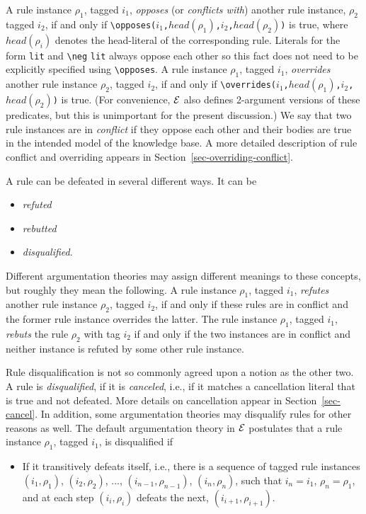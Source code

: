 \documentclass[11pt]{article}
\newcommand{\ERGO}{\mbox{\ensuremath{\cal{E}}\smaller{{\sc{RGO}}}}\xspace}
\newcommand{\FLSYSTEM}{\ERGO}
\newcommand{\bs}{\textbackslash}
\newcommand{\RULELOGNEG}{{\texttt{{\bs}neg}}\xspace}
\begin{document}
A rule instance $\rho_1$, tagged $i_1$, \emph{opposes}
(or \emph{conflicts with})  another rule
instance, $\rho_2$ tagged $i_2$, if and only if
\texttt{\bs{}opposes($i_1$,$head(\rho_1)$,$i_2$,$head(\rho_2)$)} is true,
where $head(\rho_i)$ denotes the head-literal of the corresponding rule.
Literals for the form \texttt{lit} and \texttt{\RULELOGNEG}  \texttt{lit} always oppose 
each other so this fact does not need to be explicitly specified using
\texttt{\bs{}opposes}.   
A rule instance $\rho_1$, tagged
$i_1$, \emph{overrides} another rule instance $\rho_2$, tagged $i_2$, if and
only if \texttt{\bs{}overrides($i_1$,$head(\rho_1)$,$i_2$,$head(\rho_2)$)} is
true. (For convenience, \FLSYSTEM also defines 2-argument versions of these
predicates, but this is unimportant for the present discussion.)
We say that two rule instances are in \emph{conflict} if they oppose each other
and their bodies are true in the intended model of the knowledge base.
A more detailed description of rule conflict and overriding appears in
Section~\ref{sec-overriding-conflict}.

A rule can be defeated in several different ways. It can be
\begin{itemize}
\item  \emph{refuted}
\item  \emph{rebutted} 
\item  \emph{disqualified}. 
\end{itemize}
Different argumentation theories may assign different meanings to these
concepts, but roughly they mean the following. A rule instance $\rho_1$,
tagged $i_1$, \emph{refutes} another rule instance $\rho_2$, tagged $i_2$, 
if and only if these rules are in conflict and the former rule instance
overrides the latter. The rule instance $\rho_1$,
tagged $i_1$, \emph{rebuts} the rule $\rho_2$ with tag $i_2$ if and only if the two
instances are in conflict and neither instance is refuted by some other
rule instance.

Rule disqualification is not so commonly agreed upon a notion as the other
two.  A rule is \emph{disqualified}, if it is \emph{canceled}, i.e., 
if it matches a
cancellation literal that is true and not defeated.  More details on
cancellation appear in Section~\ref{sec-cancel}. In addition, some
argumentation theories may disqualify rules for other reasons as well.
The default argumentation theory in \FLSYSTEM postulates that a
rule instance $\rho_1$, tagged $i_1$, is disqualified if
\begin{itemize}
\item If it transitively defeats itself, i.e., there is a sequence of
  tagged rule instances $(i_1,\rho_1)$, $(i_2,\rho_2)$, ...,
  $(i_{n-1},\rho_{n-1})$, $(i_n,\rho_n)$, such that $i_n=i_1$,
  $\rho_n=\rho_1$, and at each step $(i_i,\rho_i)$ defeats the next,
  $(i_{i+1},\rho_{i+1})$.
\end{itemize}
\end{document}
